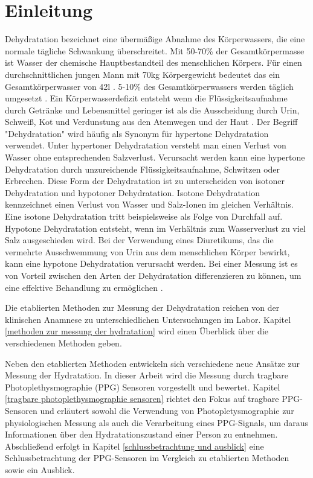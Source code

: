 \documentclass[10pt,a4paper,headinclude,twoside, plainheadsepline, open=right, numbers=noenddot, twocolumn]{article}
\begin{document}
\section{Einleitung}
\label{einleitung}
Dehydratation bezeichnet eine übermäßige Abnahme des Körperwassers, die eine normale tägliche Schwankung überschreitet. 
Mit 50-70\% der Gesamtkörpermasse ist Wasser der chemische Hauptbestandteil des menschlichen Körpers.
Für einen durchschnittlichen jungen Mann mit 70kg Körpergewicht bedeutet das ein Gesamtkörperwasser von 42l \cite{sawka2015hypohydration}.
5-10\% des Gesamtkörperwassers werden täglich umgesetzt \cite{raman2004american}.
Ein Körperwasserdefizit entsteht wenn die Flüssigkeitsaufnahme durch Getränke und Lebensmittel geringer ist als die Ausscheidung durch Urin, Schweiß, Kot und Verdunstung aus den Atemwegen und der Haut \cite{garret2018engineering}.
Der Begriff "Dehydratation" wird häufig als Synonym für hypertone Dehydratation verwendet.
Unter hypertoner Dehydratation versteht man einen Verlust von Wasser ohne entsprechenden Salzverlust. 
Verursacht werden kann eine hypertone Dehydratation durch unzureichende Flüssigkeitsaufnahme, Schwitzen oder Erbrechen.
Diese Form der Dehydratation ist zu unterscheiden von isotoner Dehydratation und hypotoner Dehydratation.
Isotone Dehydratation kennzeichnet einen Verlust von Wasser und Salz-Ionen im gleichen Verhältnis.
Eine isotone Dehydratation tritt beispielsweise als Folge von Durchfall auf.
Hypotone Dehydratation entsteht, wenn im Verhältnis zum Wasserverlust zu viel Salz ausgeschieden wird.
Bei der Verwendung eines Diuretikums, das die vermehrte Ausschwemmung von Urin aus dem menschlichen Körper bewirkt, kann eine hypotone Dehydratation verursacht werden. 
Bei einer Messung ist es von Vorteil zwischen den Arten der Dehydratation differenzieren zu können, um eine effektive Behandlung zu ermöglichen \cite{garret2018engineering}.

Die etablierten Methoden zur Messung der Dehydratation reichen von der klinischen Anamnese zu unterschiedlichen Untersuchungen im Labor.
Kapitel \ref{methoden zur messung der hydratation} wird einen Überblick über die verschiedenen Methoden geben. 

Neben den etablierten Methoden entwickeln sich verschiedene neue Ansätze zur Messung der Hydratation.
In dieser Arbeit wird die Messung durch tragbare Photoplethysmographie (PPG) Sensoren vorgestellt und bewertet.
Kapitel \ref{tragbare photoplethysmographie sensoren} richtet den Fokus auf tragbare PPG-Sensoren und erläutert sowohl die Verwendung von Photopletysmographie zur physiologischen Messung als auch die Verarbeitung eines PPG-Signals, um daraus Informationen über den Hydratationszustand einer Person zu entnehmen.
Abschließend erfolgt in Kapitel \ref{schlussbetrachtung und ausblick} eine Schlussbetrachtung der PPG-Sensoren im Vergleich zu etablierten Methoden sowie ein Ausblick. 
\end{document}
